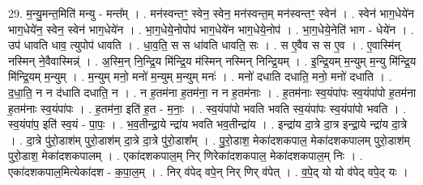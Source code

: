 \documentclass[17pt]{extarticle}
\begin{document}
29. म॒न्यु॒मन्त॒मिति॑ मन्यु - मन्त᳚म् । . मन॑स्वन्तꣳ॒॒ स्वेन॒ स्वेन॒ मन॑स्वन्त॒म् मन॑स्वन्तꣳ॒॒ स्वेन॑ । . स्वेन॑ भाग॒धेये॑न भाग॒धेये॑न॒ स्वेन॒ स्वेन॑ भाग॒धेये॑न । . भा॒ग॒धेये॒नोपोप॑ भाग॒धेये॑न भाग॒धेये॒नोप॑ । . भा॒ग॒धेये॒नेति॑ भाग - धेये॑न । . उप॑ धावति धाव॒ त्युपोप॑ धावति । . धा॒व॒ति॒ स स धा॑वति धावति॒ सः । . स ए॒वैव स स ए॒व । . ए॒वास्मि॑न् नस्मिन् ने॒वैवास्मिन्न्॑ । . अ॒स्मि॒न् नि॒न्द्रि॒य मि॑न्द्रि॒य म॑स्मिन् नस्मिन् निन्द्रि॒यम् । . इ॒न्द्रि॒यम् म॒न्युम् म॒न्यु मि॑न्द्रि॒य मि॑न्द्रि॒यम् म॒न्युम् । . म॒न्युम् मनो॒ मनो॑ म॒न्युम् म॒न्युम् मनः॑ । . मनो॑ दधाति दधाति॒ मनो॒ मनो॑ दधाति । . द॒धा॒ति॒ न न द॑धाति दधाति॒ न । . न ह॒तम॑ना ह॒तम॑ना॒ न न ह॒तम॑नाः । . ह॒तम॑नाः स्व॒यंपा॑पः स्व॒यंपा॑पो ह॒तम॑ना ह॒तम॑नाः स्व॒यंपा॑पः । . ह॒तम॑ना॒ इति॑ ह॒त - म॒नाः॒ । . स्व॒यंपा॑पो भवति भवति स्व॒यंपा॑पः स्व॒यंपा॑पो भवति । . स्व॒यंपा॑प॒ इति॑ स्व॒यं - पा॒पः॒ । . भ॒व॒तीन्द्रा॒ये न्द्रा॑य भवति भव॒तीन्द्रा॑य । . इन्द्रा॑य दा॒त्रे दा॒त्र इन्द्रा॒ये न्द्रा॑य दा॒त्रे । . दा॒त्रे पु॑रो॒डाश॑म् पुरो॒डाश॑म् दा॒त्रे दा॒त्रे पु॑रो॒डाश᳚म् । . पु॒रो॒डाश॒ मेका॑दशकपाल॒ मेका॑दशकपालम् पुरो॒डाश॑म् पुरो॒डाश॒ मेका॑दशकपालम् । . एका॑दशकपाल॒म् निर् णिरेका॑दशकपाल॒ मेका॑दशकपाल॒म् निः । . एका॑दशकपाल॒मित्येका॑दश - क॒पा॒ल॒म् । . निर् व॑पेद् वपे॒न् निर् णिर् व॑पेत् । . व॒पे॒द् यो यो व॑पेद् वपे॒द् यः । \newline
\end{document}
